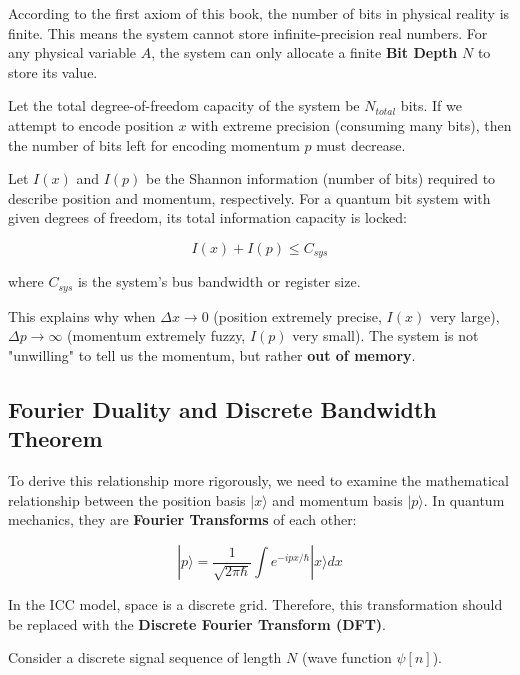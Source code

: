 According to the first axiom of this book, the number of bits in physical reality is finite. This means the system cannot store infinite-precision real numbers. For any physical variable $A$, the system can only allocate a finite \textbf{Bit Depth} $N$ to store its value.

Let the total degree-of-freedom capacity of the system be $N_{total}$ bits. If we attempt to encode position $x$ with extreme precision (consuming many bits), then the number of bits left for encoding momentum $p$ must decrease.

\begin{definition}
Let $I(x)$ and $I(p)$ be the Shannon information (number of bits) required to describe position and momentum, respectively. For a quantum bit system with given degrees of freedom, its total information capacity is locked:

\begin{equation}
I(x) + I(p) \le C_{sys}
\end{equation}

where $C_{sys}$ is the system's bus bandwidth or register size.
\end{definition}

This explains why when $\Delta x \to 0$ (position extremely precise, $I(x)$ very large), $\Delta p \to \infty$ (momentum extremely fuzzy, $I(p)$ very small). The system is not "unwilling" to tell us the momentum, but rather \textbf{out of memory}.

\subsection{Fourier Duality and Discrete Bandwidth Theorem}

To derive this relationship more rigorously, we need to examine the mathematical relationship between the position basis $|x\rangle$ and momentum basis $|p\rangle$. In quantum mechanics, they are \textbf{Fourier Transforms} of each other:

\begin{equation}
|p\rangle = \frac{1}{\sqrt{2\pi\hbar}} \int e^{-ipx/\hbar} |x\rangle dx
\end{equation}

In the ICC model, space is a discrete grid. Therefore, this transformation should be replaced with the \textbf{Discrete Fourier Transform (DFT)}.

Consider a discrete signal sequence of length $N$ (wave function $\psi[n]$).


